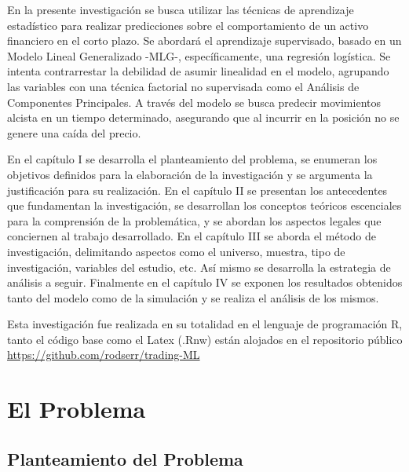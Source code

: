 \documentclass[a4paper,12pt]{Latex/Classes/PhDthesisPSnPDF}
\begin{document}
En la presente investigación se busca utilizar las técnicas de aprendizaje estadístico para realizar predicciones sobre el comportamiento de un activo financiero en el corto  plazo. Se abordará el aprendizaje supervisado, basado en un Modelo Lineal Generalizado -MLG-, específicamente, una regresión logística. Se intenta contrarrestar la debilidad de asumir linealidad en el modelo, agrupando las variables con una técnica factorial no supervisada como el Análisis de Componentes Principales. A través del modelo se busca predecir movimientos alcista en un tiempo determinado, asegurando que al incurrir en la posición no se genere una caída del precio.


En el capítulo I se desarrolla el planteamiento del problema, se enumeran los objetivos definidos para la elaboración de la investigación y se argumenta la justificación para su realización. En el capítulo II se presentan los antecedentes que fundamentan la investigación, se desarrollan los conceptos teóricos escenciales para la comprensión de la problemática, y se abordan los aspectos legales que conciernen al trabajo desarrollado. En el capítulo III se aborda el método de investigación, delimitando aspectos como el universo, muestra, tipo de investigación, variables del estudio, etc. Así mismo se desarrolla la estrategia de análisis a seguir. Finalmente en el capítulo IV se exponen los resultados obtenidos tanto del modelo como de la simulación y se realiza el análisis de los mismos.

Esta investigación fue realizada en su totalidad en el lenguaje de programación R, tanto el código base como el Latex (.Rnw) están alojados en el repositorio público \url{https://github.com/rodserr/trading-ML} 

\chapter{El Problema}

\section{Planteamiento del Problema}
\end{document}

